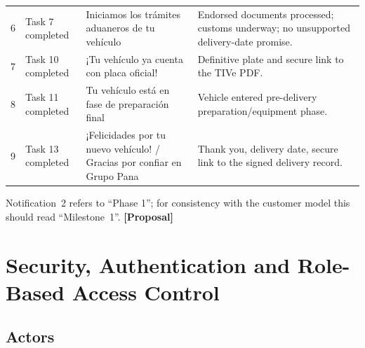 \documentclass[11pt,a4paper]{article}
\newcommand{\tagprop}{\textcolor{orange!80!black}{\textbf{[Proposal]}}}
\begin{document}
\begin{longtable}{@{}rL{3.6cm}L{4.6cm}L{4.4cm}@{}}
	6                                                           & Task 7 completed                                                      & Iniciamos los trámites aduaneros de tu vehículo                         & Endorsed documents processed; customs underway; no unsupported delivery-date promise.    \\
	7                                                           & Task 10 completed                                                     & ¡Tu vehículo ya cuenta con placa oficial!                               & Definitive
	plate and secure link to the TIVe PDF.                                                                                                                                                                                                                                                                   \\
	8                                                           & Task 11 completed                                                     & Tu vehículo está en fase de preparación final                           & Vehicle entered pre-delivery preparation/equipment phase.                                \\
	9                                                           & Task 13 completed                                                     & ¡Felicidades por tu nuevo vehículo! / Gracias por confiar en Grupo Pana & Thank you, delivery date, secure link to the signed delivery record.                     \\
	\bottomrule
\end{longtable}

Notification~2 refers to ``Phase 1''; for consistency with the customer model
this should read ``Milestone~1''. \tagprop{}

\section{Security, Authentication and Role-Based Access Control}\label{sec:auth}

\subsection{Actors}
\end{document}
